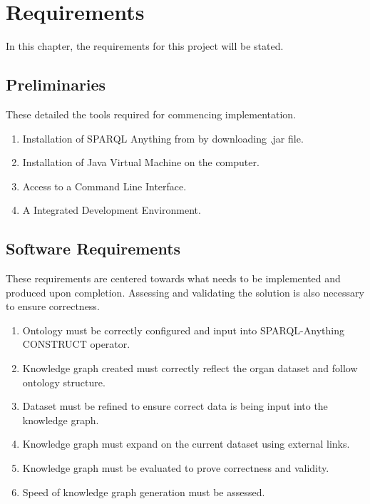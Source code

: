 \chapter{Requirements}
In this chapter, the requirements for this project will be stated. 

\section{Preliminaries}
\hspace{0.5cm} These detailed the tools required for commencing implementation.
\begin{enumerate}
    \itemsep0em 
\item Installation of SPARQL Anything from \cite{sparqlanythinggithub} by downloading .jar file.
\item Installation of Java Virtual Machine on the computer. 
\item Access to a Command Line Interface.
\item A Integrated Development Environment.
\end{enumerate}

\section{Software Requirements}
\hspace{0.5cm} These requirements are centered towards what needs to be implemented and produced upon completion. Assessing and validating the solution is also necessary to ensure correctness.
\begin{enumerate}
    \itemsep0em 
\item Ontology must be correctly configured and input into SPARQL-Anything CONSTRUCT operator.
\item Knowledge graph created must correctly reflect the organ dataset and follow ontology structure.
\item Dataset must be refined to ensure correct data is being input into the knowledge graph.
\item Knowledge graph must expand on the current dataset using external links.
\item Knowledge graph must be evaluated to prove correctness and validity.
\item Speed of knowledge graph generation must be assessed.
\end{enumerate}

